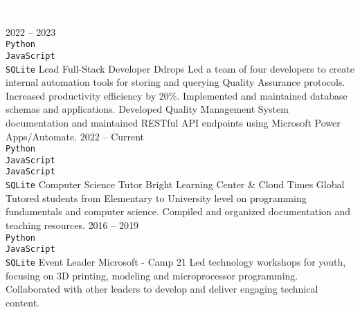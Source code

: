 \documentclass[9pt]{src/developercv} %
\begin{document}

\vspace{\baselineskip} %
\colorbox{cyan900}{\textcolor{white}{\MakeUppercase{\textbf{Experience}}}}\\%

\begin{entrylist}
	\entry
		{2022 -- 2023\\
		\footnotesize{\texttt{Python}}\hfill\\
		\footnotesize{\texttt{JavaScript}}\hfill\\
		\footnotesize{\texttt{SQLite}}\hfill}
		{Lead Full-Stack Developer}
		{Ddrops}
		{Led a team of four developers to create internal automation tools for storing and querying Quality Assurance protocols. Increased productivity efficiency by 20\%. Implemented and maintained database schemas and applications. Developed Quality Management System documentation and maintained RESTful API endpoints using Microsoft Power Apps/Automate.}
	\entry
		{2022 -- Current\\
		\footnotesize{\texttt{Python}}\hfill\\
		\footnotesize{\texttt{JavaScript}}\hfill\\
		\footnotesize{\texttt{JavaScript}}\hfill\\
		\footnotesize{\texttt{SQLite}}\hfill}
		{Computer Science Tutor}
		{Bright Learning Center \& Cloud Times Global}
		{Tutored students from Elementary to University level on programming fundamentals and computer science. Compiled and organized documentation and teaching resources.}
	\entry
		{2016 -- 2019\\		\footnotesize{\texttt{Python}}\hfill\\
		\footnotesize{\texttt{JavaScript}}\hfill\\
		\footnotesize{\texttt{SQLite}}\hfill}
		{Event Leader}
		{Microsoft - Camp 21}
		{Led technology workshops for youth, focusing on 3D printing, modeling and microprocessor programming. Collaborated with other leaders to develop and deliver engaging technical content.}
\end{entrylist}

\end{document}
